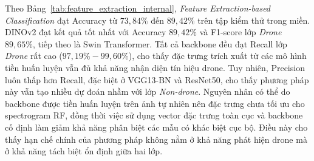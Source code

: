 \documentclass[../DoAn.tex]{subfiles}
\begin{document}
\begin{table}[H]
    \centering
    \renewcommand{\arraystretch}{1.3}
    \scriptsize
    \setlength{\tabcolsep}{3pt}
    \caption{Kết quả Feature Extraction-based Classification trên tập kiểm thử trong miền}
    \label{tab:feature_extraction_internal}

\end{table}
Theo Bảng~\ref{tab:feature_extraction_internal}, \textit{Feature Extraction-based Classification} đạt Accuracy từ $73{,}84\%$ đến $89{,}42\%$ trên tập kiểm thử trong miền. DINOv2 đạt kết quả tốt nhất với Accuracy $89{,}42\%$ và F1-score lớp \textit{Drone} $89{,}65\%$, tiếp theo là Swin Transformer. Tất cả backbone đều đạt Recall lớp \textit{Drone} rất cao ($97{,}19\%-99{,}60\%$), cho thấy đặc trưng trích xuất từ các mô hình tiền huấn luyện vẫn đủ khả năng nhận diện tín hiệu drone. Tuy nhiên, Precision luôn thấp hơn Recall, đặc biệt ở VGG13-BN và ResNet50, cho thấy phương pháp này vẫn tạo nhiều dự đoán nhầm với lớp \textit{Non-drone}. Nguyên nhân có thể do backbone được tiền huấn luyện trên ảnh tự nhiên nên đặc trưng chưa tối ưu cho spectrogram RF, đồng thời việc sử dụng vector đặc trưng toàn cục và backbone cố định làm giảm khả năng phân biệt các mẫu có khác biệt cục bộ. Điều này cho thấy hạn chế chính của phương pháp không nằm ở khả năng phát hiện drone mà ở khả năng tách biệt ổn định giữa hai lớp. 
\end{document}
